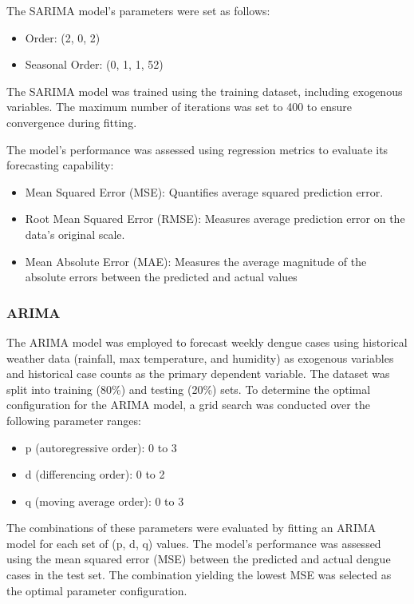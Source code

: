 The SARIMA model's parameters were set as follows:
\begin{itemize}
	\item Order: (2, 0, 2)
	\item Seasonal Order: (0, 1, 1, 52)
\end{itemize}

The SARIMA model was trained using the training dataset, including exogenous variables. The maximum number of iterations was set to 400 to ensure convergence during fitting.

The model's performance was assessed using regression metrics to evaluate its forecasting capability:
\begin{itemize}
	\item Mean Squared Error (MSE): Quantifies average squared prediction error.
	\item Root Mean Squared Error (RMSE): Measures average prediction error on the data's original scale.
	\item Mean Absolute Error (MAE): Measures the average  magnitude of the absolute errors between the predicted and actual values
	\end{itemize}

\subsubsection{ARIMA}
The ARIMA model was employed to forecast weekly dengue cases using historical weather data (rainfall, max temperature, and humidity) as exogenous variables and historical case counts as the primary dependent variable.
The dataset was split into training (80\%) and testing (20\%) sets. To determine the optimal configuration for the ARIMA model, a grid search was conducted over the following parameter ranges:
\begin{itemize}
	\item p (autoregressive order): 0 to 3
	\item d (differencing order): 0 to 2
	\item q (moving average order): 0 to 3
\end{itemize}
The combinations of these parameters were evaluated by fitting an ARIMA model for each set of (p, d, q) values. The model's performance was assessed using the mean squared error (MSE) between the predicted and actual dengue cases in the test set. The combination yielding the lowest MSE was selected as the optimal parameter configuration.

